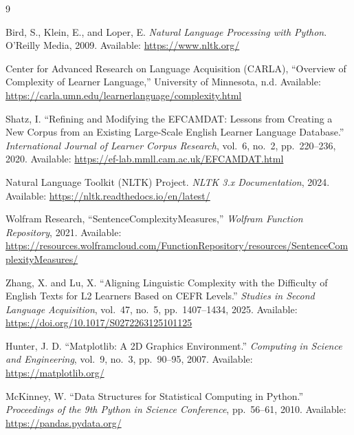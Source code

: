 \documentclass[11pt]{article}
\begin{document}
\begin{thebibliography}{9}
 
Bird, S., Klein, E., and Loper, E. \textit{Natural Language Processing with Python}. O'Reilly Media, 2009. Available: \url{https://www.nltk.org/}
 
Center for Advanced Research on Language Acquisition (CARLA), ``Overview of Complexity of Learner Language,'' University of Minnesota, n.d. Available: \url{https://carla.umn.edu/learnerlanguage/complexity.html}
 
Shatz, I. ``Refining and Modifying the EFCAMDAT: Lessons from Creating a New Corpus from an Existing Large-Scale English Learner Language Database.'' \textit{International Journal of Learner Corpus Research}, vol.~6, no.~2, pp.~220--236, 2020. Available: \url{https://ef-lab.mmll.cam.ac.uk/EFCAMDAT.html}
 
Natural Language Toolkit (NLTK) Project. \textit{NLTK 3.x Documentation}, 2024. Available: \url{https://nltk.readthedocs.io/en/latest/}
 
Wolfram Research, ``SentenceComplexityMeasures,'' \textit{Wolfram Function Repository}, 2021. Available: \url{https://resources.wolframcloud.com/FunctionRepository/resources/SentenceComplexityMeasures/}
 
Zhang, X. and Lu, X. ``Aligning Linguistic Complexity with the Difficulty of English Texts for L2 Learners Based on CEFR Levels.'' \textit{Studies in Second Language Acquisition}, vol.~47, no.~5, pp.~1407--1434, 2025. Available: \url{https://doi.org/10.1017/S0272263125101125}
 
Hunter, J. D. ``Matplotlib: A 2D Graphics Environment.'' \textit{Computing in Science and Engineering}, vol.~9, no.~3, pp.~90--95, 2007. Available: \url{https://matplotlib.org/}
 
McKinney, W. ``Data Structures for Statistical Computing in Python.'' \textit{Proceedings of the 9th Python in Science Conference}, pp.~56--61, 2010. Available: \url{https://pandas.pydata.org/}
 
\end{thebibliography}
 
\end{document}

